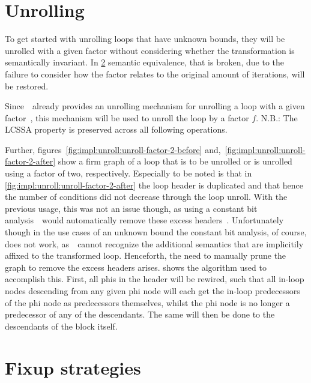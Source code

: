 \section{Unrolling}\label{sec:impl:unroll}

To get started with unrolling loops that have unknown bounds, they will be unrolled with a given factor without considering whether the transformation is semantically invariant.
In \cref{sec:impl:fixup} semantic equivalence, that is broken, due to the failure to consider how the factor relates to the original amount of iterations, will be restored.

Since~\libFIRM~already provides an unrolling mechanism for unrolling a loop with a given factor~\cite{aebi18bachelorarbeit}, this mechanism will be used to unroll the loop by a factor $f$.
N.B.: The LCSSA property is preserved across all following operations.

Further, figures~\ref{fig:impl:unroll:unroll-factor-2-before} and,~\ref{fig:impl:unroll:unroll-factor-2-after} show a firm graph of a loop that is to be unrolled or is unrolled using a factor of two, respectively.
Especially to be noted is that in \cref{fig:impl:unroll:unroll-factor-2-after} the loop header is duplicated and that hence the number of conditions did not decrease through the loop unroll.
With the previous usage, this was not an issue though, as using a constant bit analysis~\libFIRM~would automatically remove these excess headers~\cite{aebi18bachelorarbeit}.
Unfortunately though in the use cases of an unknown bound the constant bit analysis, of course, does not work, as~\libFIRM~cannot recognize the additional semantics that are implicitily affixed to the transformed loop.
Henceforth, the need to manually prune the graph to remove the excess headers arises.
 shows the algorithm used to accomplish this.
First, all phis in the header will be rewired, such that all in-loop nodes descending from any given phi node will each get the in-loop predecessors of the phi node as predecessors themselves, whilst the phi node is no longer a predecessor of any of the descendants.
The same will then be done to the descendants of the block itself.







\section{Fixup strategies}\label{sec:impl:fixup}

